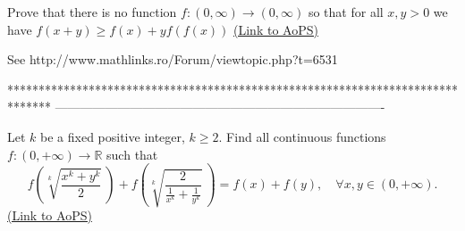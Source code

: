 \begin{problem}
	Prove that there is no function $ f: (0,\infty) \to (0,\infty)$ so that for all $ x,y>0$ we have $ f(x+y)\geq f(x)+yf(f(x))$
	\flushright \href{https://artofproblemsolving.com/community/c6h313430}{(Link to AoPS)}
\end{problem}



\begin{solution}
	See http://www.mathlinks.ro/Forum/viewtopic.php?t=6531
\end{solution}
*******************************************************************************
-------------------------------------------------------------------------------

\begin{problem}
	Let $ k$  be a fixed positive integer, $ k \ge 2$. Find all continuous functions $ f : (0, + \infty ) \to \mathbb{R}$ such that 
\[ f \left( \sqrt [k]{\frac {x^{k} + y^{k}}{2}} \ \right) + f \left(\sqrt [k]{\frac {2}{\frac {1}{x^{k}} + \frac {1}{y^{k}}}} \ \right) = f(x) + f(y) ,\quad \forall x ,y \in ( 0 , + \infty ).\]
	\flushright \href{https://artofproblemsolving.com/community/c6h313486}{(Link to AoPS)}
\end{problem}



